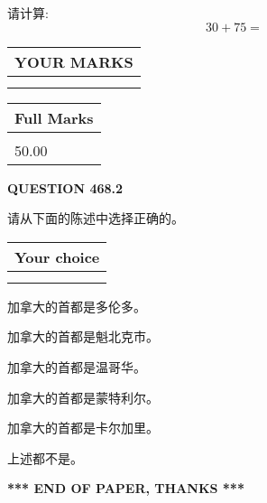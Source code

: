 \documentclass{ctexart}
\begin{document}
  
 
请计算:
\begin{equation}
30 +  %
75 = \nonumber
\end{equation}
 

 

 
  
\vspace{0.2in}
  
\noindent\begin{tabular}{|l|}
\hline
 YOUR MARKS  \\
\hline
 \\ 
 \\ 
\hline
\end{tabular}
\hspace{0.05in} \begin{tabular}{|l|}
\hline
 Full Marks  \\
\hline
 \\ 
50.00 \\
\hline
\end{tabular}
{\textbf{\Large{QUESTION
468.2 
}}}
  
  
请从下面的陈述中选择正确的。
  
  
\noindent\hspace{3.0in} \begin{tabular}{|l|}
\hline
Your choice \\
\hline
 \\ 
 \\ 
\hline
\end{tabular}
  
  
 
 
加拿大的首都是多伦多。
 
 
加拿大的首都是魁北克市。
 
 
加拿大的首都是温哥华。
 
 
加拿大的首都是蒙特利尔。
 
 
加拿大的首都是卡尔加里。
 
 
 上述都不是。
 
 
   
   
 \vspace{0.2in}
 
   
   
   
   
\vspace{1.0in} 
{\textbf{\large{ *** END OF PAPER, THANKS *** }}} 
   
\end{document}
